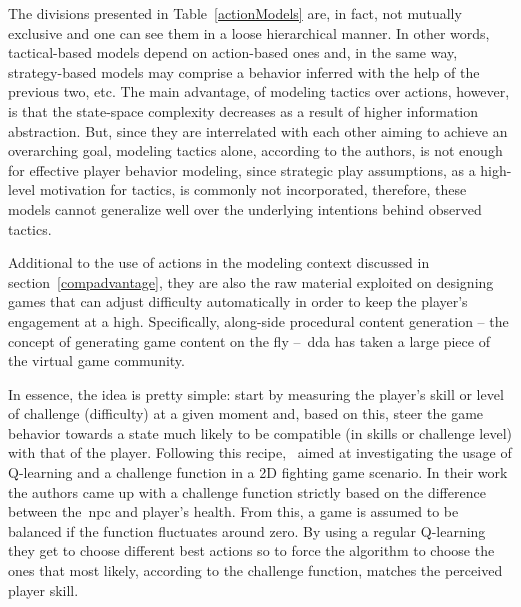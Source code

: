 The divisions presented in Table~\ref{actionModels} are, in fact, not mutually exclusive and one can see them in a loose hierarchical manner. In other words, tactical-based models depend on action-based ones and, in the same way, strategy-based models may comprise a behavior inferred with the help of the previous two, etc. The main advantage, of modeling tactics over actions, however, is that the state-space complexity decreases as a result of higher information abstraction. But, since they are interrelated with each other aiming to achieve an overarching goal, modeling tactics alone, according to the authors, is not enough for effective player behavior modeling, since strategic play assumptions, as a high-level motivation for tactics, is commonly not incorporated, therefore, these models cannot generalize well over the underlying intentions behind observed tactics.

Additional to the use of actions in the modeling context discussed in section~\ref{compadvantage}, they are also the raw material exploited on designing games that can adjust difficulty automatically in order to keep the player's engagement at a high. Specifically, along-side procedural content generation -- the concept of generating game content on the fly --~\gls{dda} has taken a large piece of the virtual game community.

In essence, the idea is pretty simple: start by measuring the player's skill or level of challenge (difficulty) at a given moment and, based on this, steer the game behavior towards a state much likely to be compatible (in skills or challenge level) with that of the player. Following this recipe,~\cite{andrade_online_2004, andrade_extending_2005} aimed at investigating the usage of Q-learning and a challenge function in a 2D fighting game scenario. In their work the authors came up with a challenge function strictly based on the difference between the~\gls{npc} and player's health. From this, a game is assumed to be balanced if the function fluctuates around zero. By using a regular Q-learning they get to choose different best actions so to force the algorithm to choose the ones that most likely, according to the challenge function, matches the perceived player skill. 


